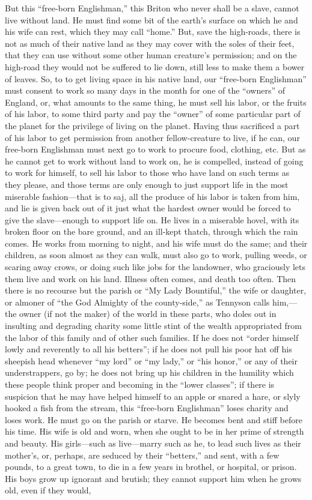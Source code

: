 \documentclass{book}
\begin{document}
But this “free-born Englishman,” this Briton who never shall be a slave, cannot live without land. He must find some bit of the earth’s surface on which he and his wife can rest, which they may call “home.” But, save the high-roads, there is not as much of their native land as they may cover with the soles of their feet, that they can use without some other human creature’s permission; and on the high-road they would not be suffered to lie down, still less to make them a bower of leaves. So, to to get living space in his native land, our “free-born Englishman” must consent to work so many days in the month for one of the “owners” of England, or, what amounts to the same thing, he must sell his labor, or the fruits of his labor, to some third party and pay the “owner” of some particular part of the planet for the privilege of living on the planet. Having thus sacrificed a part of his labor to get permission from another fellow-creature to live, if he can, our free-born Englishman must next go to work to procure food, clothing, etc. But as he cannot get to work without land to work on, he is compelled, instead of going to work for himself, to sell his labor to those who have land on such terms as they please, and those terms are only enough to just support life in the most miserable fashion—that is to saj, all the produce of his labor is taken from him, and lie is given back out of it just what the hardest owner would be forced to give the slave—enough to support life on. He lives in a miserable hovel, with its broken floor on the bare ground, and an ill-kept thatch, through which the rain comes. He works from morning to night, and his wife must do the same; and their children, as soon almost as they can walk, must also go to work, pulling weeds, or scaring away crows, or doing such like jobs for the landowner, who graciously lets them live and work on his land. Illness often comes, and death too often. Then there is no recourse but the parish or “My Lady Bountiful,” the wife or daughter, or almoner of “the God Almighty of the county-side,” as Tennyson calls him,—the owner (if not the maker) of the world in these parts, who doles out in insulting and degrading charity some little stint of the wealth appropriated from the labor of this family and of other such families. If he does not “order himself lowly and reverently to all his betters”; if he does not pull his poor hat off his sheepish head whenever “my lord” or “my lady,” or “his honor,” or any of their understrappers, go by; he does not bring up his children in the humility which these people think proper and becoming in the “lower classes”; if there is suspicion that he may have helped himself to an apple or snared a hare, or slyly hooked a fish from the stream, this “free-born Englishman” loses charity and loses work. He must go on the parish or starve. He becomes bent and stiff before his time. His wife is old and worn, when she ought to be in her prime of strength and beauty. His girls—such as live—marry such as he, to lead such lives as their mother’s, or, perhaps, are seduced by their “betters,” and sent, with a few pounds, to a great town, to die in a few years in brothel, or hospital, or prison. His boys grow up ignorant and brutish; they cannot support him when he grows old, even if they would, 
\end{document}

